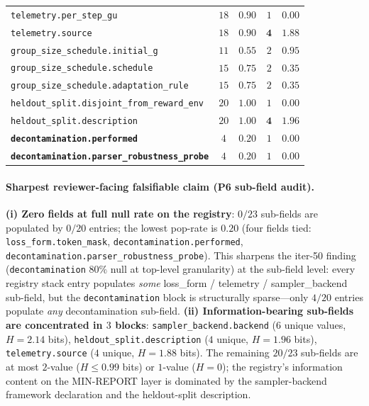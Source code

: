 \begin{table}[t]
\begin{tabular}{lcccc}
\texttt{telemetry.per\_step\_gu}              & $18$ & $0.90$ & $1$ & $0.00$ \\
\texttt{telemetry.source}                     & $18$ & $0.90$ & $\mathbf{4}$ & $\mathbf{1.88}$ \\
\texttt{group\_size\_schedule.initial\_g}      & $11$ & $0.55$ & $2$ & $0.95$ \\
\texttt{group\_size\_schedule.schedule}        & $15$ & $0.75$ & $2$ & $0.35$ \\
\texttt{group\_size\_schedule.adaptation\_rule}& $15$ & $0.75$ & $2$ & $0.35$ \\
\texttt{heldout\_split.disjoint\_from\_reward\_env} & $20$ & $1.00$ & $1$ & $0.00$ \\
\texttt{heldout\_split.description}           & $20$ & $1.00$ & $\mathbf{4}$ & $\mathbf{1.96}$ \\
\textbf{\texttt{decontamination.performed}}   & $4$  & $\mathbf{0.20}$ & $1$ & $0.00$ \\
\textbf{\texttt{decontamination.parser\_robustness\_probe}} & $4$ & $\mathbf{0.20}$ & $1$ & $0.00$ \\
\bottomrule
\end{tabular}
\end{table}

\paragraph{Sharpest reviewer-facing falsifiable claim (P6 sub-field audit).}
\textbf{(i) Zero fields at full null rate on the registry}: $0/23$
sub-fields are populated by $0/20$ entries; the lowest pop-rate is
$0.20$ (four fields tied: \texttt{loss\_form.token\_mask},
\texttt{decontamination.performed}, \texttt{decontamination.parser\_robustness\_probe}).
This sharpens the iter-50 finding (\texttt{decontamination} $80\%$ null
at top-level granularity) at the sub-field level: every registry stack
entry populates \emph{some} loss\_form / telemetry / sampler\_backend
sub-field, but the \texttt{decontamination} block is structurally
sparse---only $4/20$ entries populate \emph{any} decontamination
sub-field. \textbf{(ii) Information-bearing sub-fields are concentrated
in $3$ blocks}: \texttt{sampler\_backend.backend} ($6$ unique values,
$H = 2.14$ bits), \texttt{heldout\_split.description} ($4$ unique,
$H = 1.96$ bits), \texttt{telemetry.source} ($4$ unique, $H = 1.88$
bits). The remaining $20/23$ sub-fields are at most $2$-value ($H \le
0.99$ bits) or $1$-value ($H = 0$); the registry's information content
on the MIN-REPORT layer is dominated by the sampler-backend framework
declaration and the heldout-split description.

